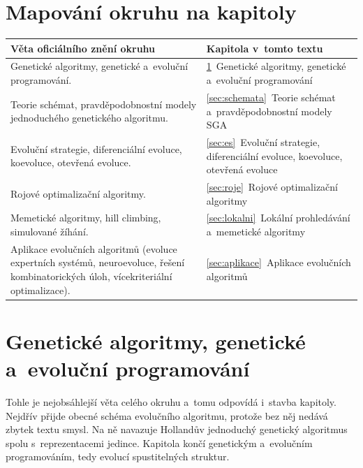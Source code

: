 \documentclass[11pt,a4paper]{article}
\theoremstyle{definition}
\begin{document}
\vspace{2mm}

\section*{Mapování okruhu na kapitoly}

\begin{center}
\small
\begin{tabular}{@{}>{\raggedright\arraybackslash}p{8.6cm}>{\raggedright\arraybackslash}p{7.4cm}@{}}
\toprule
\textbf{Věta oficiálního znění okruhu} & \textbf{Kapitola v~tomto textu} \\
\midrule
Genetické algoritmy, genetické a~evoluční programování.
  & \ref{sec:ga}~Genetické algoritmy, genetické a~evoluční programování \\
Teorie schémat, pravděpodobnostní modely jednoduchého genetického algoritmu.
  & \ref{sec:schemata}~Teorie schémat a~pravděpodobnostní modely SGA \\
Evoluční strategie, diferenciální evoluce, koevoluce, otevřená evoluce.
  & \ref{sec:es}~Evoluční strategie, diferenciální evoluce, koevoluce, otevřená evoluce \\
Rojové optimalizační algoritmy.
  & \ref{sec:roje}~Rojové optimalizační algoritmy \\
Memetické algoritmy, hill climbing, simulované žíhání.
  & \ref{sec:lokalni}~Lokální prohledávání a~memetické algoritmy \\
Aplikace evolučních algoritmů (evoluce expertních systémů, neuroevoluce, řešení
kombinatorických úloh, vícekriteriální optimalizace).
  & \ref{sec:aplikace}~Aplikace evolučních algoritmů \\
\bottomrule
\end{tabular}
\end{center}

\vspace{2mm}
\tableofcontents
\newpage

\section{Genetické algoritmy, genetické a~evoluční programování}
\label{sec:ga}

Tohle je nejobsáhlejší věta celého okruhu a~tomu odpovídá i~stavba kapitoly. Nejdřív přijde
obecné schéma evolučního algoritmu, protože bez něj nedává zbytek textu smysl. Na ně navazuje
Hollandův jednoduchý genetický algoritmus spolu s~reprezentacemi jedince. Kapitola končí
genetickým a~evolučním programováním, tedy evolucí spustitelných struktur.
\end{document}
